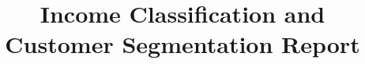 \documentclass[10pt]{article}
\title{Income Classification and \\ Customer Segmentation Report}
\date{}
\begin{document}
\begin{singlespace}
\maketitle
\tableofcontents
\end{singlespace}

\newpage








\end{document}

